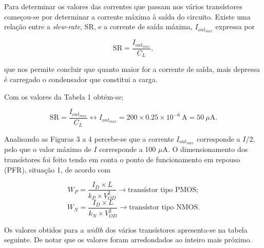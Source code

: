 \documentclass[11pt]{article}
\numberwithin{equation}{section}
\begin{document}
Para determinar os valores das correntes que passam nos vários transístores começou-se por determinar a corrente máxima à saída do circuito. Existe uma relação entre a \textit{slew-rate}, SR, e a corrente de saída máxima, $I_{out_{max}}$ expressa por

\vspace{-3mm}
\begin{equation}
\text{SR} = \frac{I_{out_{max}}}{C_L},
\end{equation}

\vspace{1mm}
que nos permite concluir que quanto maior for a corrente de saída, mais depressa é carregado o condensador que constitui a carga.

Com os valores da Tabela 1 obtém-se:

\vspace{-3mm}
\begin{equation}
\text{SR} = \frac{I_{out_{max}}}{C_L} \leftrightarrow I_{out_{max}} = 200 \times 0.25 \times 10^{-6}~\text{A} = 50~\mu \text{A}.
\end{equation}

\vspace{1mm}
Analisando as Figuras 3 a 4 percebe-se que a corrente $I_{out_{max}}$ corresponde a $I/2$, pelo que o valor máximo de $I$ corresponde a 100 $\mu$A. O dimensionamento dos transístores foi feito tendo em conta o ponto de funcionamento em repouso (PFR), situação 1, de acordo com

\vspace{-3mm}
\begin{equation}
W_P  = \frac{I_{D} \times L}{k_P \times V_{OD}^2} \rightarrow \text{transístor tipo PMOS};
\end{equation}
\vspace{1mm}
\begin{equation}
W_N  = \frac{I_{D} \times L}{k_N \times V_{OD}^2} \rightarrow \text{transístor tipo NMOS}.
\end{equation}

\vspace{1mm}
Os valores obtidos para a \textit{width} dos vários transístores apresenta-se na tabela seguinte. De notar que os valores foram arredondados ao inteiro mais próximo.
\end{document}
